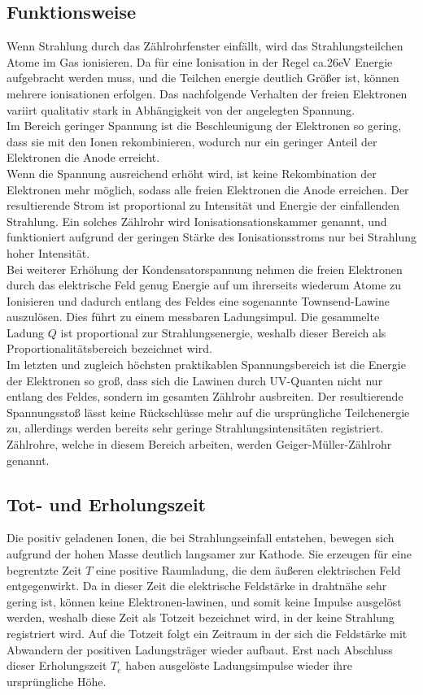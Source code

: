 \documentclass{scrartcl}
\begin{document}
\subsection{Funktionsweise}
Wenn Strahlung durch das Zählrohrfenster einfällt, wird das Strahlungsteilchen Atome im Gas ionisieren. Da für eine Ionisation in der Regel ca.26eV Energie aufgebracht werden muss, und die Teilchen energie deutlich Größer ist, können mehrere ionisationen erfolgen. Das nachfolgende Verhalten der freien Elektronen variirt qualitativ stark in Abhängigkeit von der angelegten Spannung. \\
Im Bereich geringer Spannung ist die Beschleunigung der Elektronen so gering, dass sie mit den Ionen rekombinieren, wodurch nur ein geringer Anteil der Elektronen die Anode erreicht.\\ Wenn die Spannung ausreichend erhöht wird, ist keine Rekombination der Elektronen mehr möglich, sodass alle freien Elektronen die Anode erreichen. Der resultierende Strom ist proportional zu Intensität und Energie der einfallenden Strahlung. Ein solches Zählrohr wird Ionisationsationskammer genannt, und funktioniert aufgrund der geringen Stärke des Ionisationsstroms nur bei Strahlung hoher Intensität. \\
Bei weiterer Erhöhung der Kondensatorspannung nehmen die freien Elektronen durch das elektrische Feld genug Energie auf um ihrerseits wiederum Atome zu Ionisieren und dadurch entlang des Feldes eine sogenannte Townsend-Lawine auszulösen. Dies führt zu einem messbaren Ladungsimpul. Die gesammelte Ladung $Q$ ist proportional zur Strahlungsenergie, weshalb dieser Bereich als Proportionalitätsbereich bezeichnet wird. \\ Im letzten und zugleich höchsten praktikablen Spannungsbereich ist die Energie der Elektronen so groß, dass sich die Lawinen durch UV-Quanten nicht nur entlang des Feldes, sondern im gesamten Zählrohr ausbreiten. Der resultierende Spannungsstoß lässt keine Rückschlüsse mehr auf die ursprüngliche Teilchenergie zu, allerdings werden bereits sehr geringe Strahlungsintensitäten registriert. Zählrohre, welche in diesem Bereich arbeiten, werden Geiger-Müller-Zählrohr genannt.
\subsection{Tot- und Erholungszeit}
Die positiv geladenen Ionen, die bei Strahlungseinfall entstehen, bewegen sich aufgrund der hohen Masse deutlich langsamer zur Kathode. Sie erzeugen für eine begrentzte Zeit $T$ eine positive Raumladung, die dem äußeren elektrischen Feld entgegenwirkt. Da in dieser Zeit die elektrische Feldstärke in drahtnähe sehr gering ist, können keine Elektronen-lawinen, und somit keine Impulse ausgelöst werden, weshalb diese Zeit als Totzeit bezeichnet wird, in der keine Strahlung registriert wird. Auf die Totzeit folgt ein Zeitraum in der sich die Feldstärke mit Abwandern der positiven Ladungsträger wieder aufbaut. Erst nach Abschluss dieser Erholungszeit $T_e$ haben ausgelöste Ladungsimpulse wieder ihre ursprüngliche Höhe.
\end{document}
